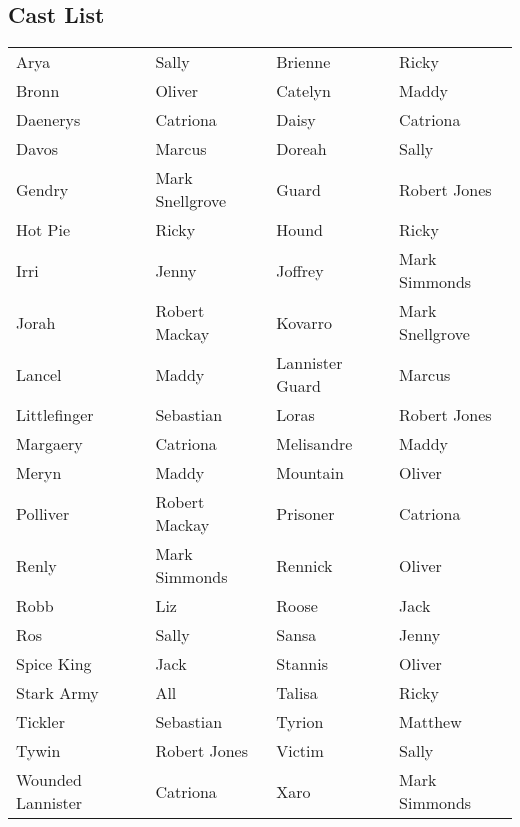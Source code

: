 \subsection*{Cast List}
\begin{tabular}{ll|ll}\\
Arya & Sally &  Brienne & Ricky\\
Bronn & Oliver &  Catelyn & Maddy\\
Daenerys & Catriona &  Daisy & Catriona\\
Davos & Marcus &  Doreah & Sally\\
Gendry & Mark Snellgrove &  Guard & Robert Jones\\
Hot Pie & Ricky &  Hound & Ricky\\
Irri & Jenny &  Joffrey & Mark Simmonds\\
Jorah & Robert Mackay &  Kovarro & Mark Snellgrove\\
Lancel & Maddy &  Lannister Guard & Marcus\\
Littlefinger & Sebastian &  Loras & Robert Jones\\
Margaery & Catriona &  Melisandre & Maddy\\
Meryn & Maddy &  Mountain & Oliver\\
Polliver & Robert Mackay &  Prisoner & Catriona\\
Renly & Mark Simmonds &  Rennick & Oliver\\
Robb & Liz &  Roose & Jack\\
Ros & Sally &  Sansa & Jenny\\
Spice King & Jack &  Stannis & Oliver\\
Stark Army & All &  Talisa & Ricky\\
Tickler & Sebastian &  Tyrion & Matthew\\
Tywin & Robert Jones &  Victim & Sally\\
Wounded Lannister & Catriona &  Xaro & Mark Simmonds\\
\end{tabular}
